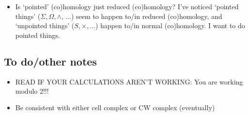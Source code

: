 \documentclass{MetricNotes2023}
\begin{document}
\begin{itemize}
\item Is `pointed' (co)homology just reduced (co)homology? I've noticed `pointed things' (\(\Sigma, \Omega, \wedge\), ...) seem to happen to/in reduced (co)homology, and `unpointed things' (\(S, \times, ...\)) happen to/in normal (co)homology. I want to do pointed things. 
\end{itemize}

\subsection{To do/other notes}

\begin{itemize}
\item READ IF YOUR CALCULATIONS AREN'T WORKING: You are working modulo 2!!!
\item Be consistent with either cell complex or CW complex (eventually)
\end{itemize}

\printbibliography
\end{document}
